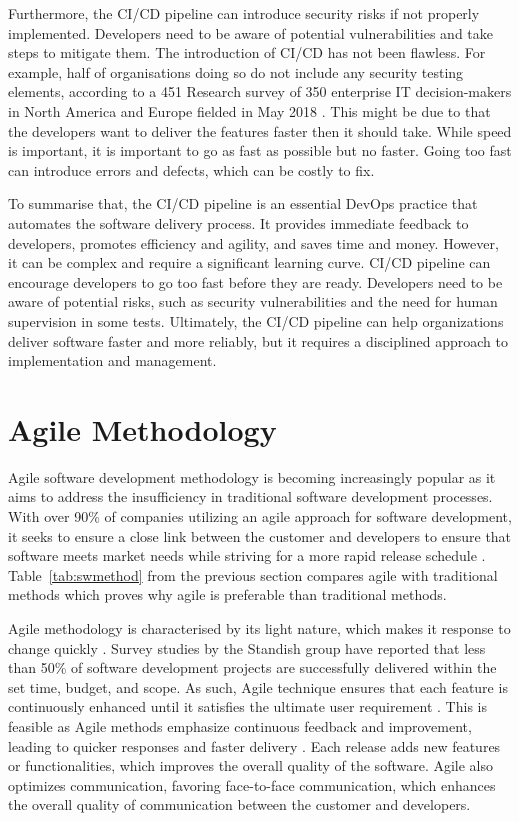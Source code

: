 Furthermore, the CI/CD pipeline can introduce security risks if not properly implemented. Developers need to be aware of potential vulnerabilities and take steps to mitigate them. The introduction of CI/CD has not been flawless. For example, half of organisations doing so do not include any security testing elements, according to a 451 Research survey of 350 enterprise IT decision-makers in North America and Europe fielded in May 2018 \cite{clark}. This might be due to that the developers want to deliver the features faster then it should take. While speed is important, it is important to go as fast as possible but no faster. Going too fast can introduce errors and defects, which can be costly to fix. 

To summarise that, the CI/CD pipeline is an essential DevOps practice that automates the software delivery process. It provides immediate feedback to developers, promotes efficiency and agility, and saves time and money. However, it can be complex and require a significant learning curve. CI/CD pipeline can encourage developers to go too fast before they are ready. Developers need to be aware of potential risks, such as security vulnerabilities and the need for human supervision in some tests. Ultimately, the CI/CD pipeline can help organizations deliver software faster and more reliably, but it requires a disciplined approach to implementation and management.

\section{Agile Methodology}
Agile software development methodology is becoming increasingly popular as it aims to address the insufficiency in traditional software development processes. With over 90\% of companies utilizing an agile approach for software development, it seeks to ensure a close link between the customer and developers to ensure that software meets market needs while striving for a more rapid release schedule \cite{hlrf}. Table~\ref{tab:swmethod} from the previous section compares agile with traditional methods which proves why agile is preferable than traditional methods.

Agile methodology is characterised by its light nature, which makes it response to change quickly \cite{koch}. Survey studies by the Standish group have reported that less than 50\% of software development projects are successfully delivered within the set time, budget, and scope. As such, Agile technique ensures that each feature is continuously enhanced until it satisfies the ultimate user requirement \cite{aaa}. This is feasible as Agile methods emphasize continuous feedback and improvement, leading to quicker responses and faster delivery \cite{dragos}. Each release adds new features or functionalities, which improves the overall quality of the software. Agile also optimizes communication, favoring face-to-face communication, which enhances the overall quality of communication between the customer and developers\cite{koch}.

